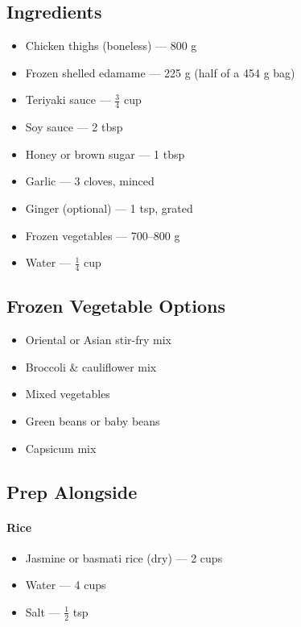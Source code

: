 \documentclass[11pt,a4paper]{article}
\begin{document}
\subsection*{Ingredients}
\begin{itemize}
    \item Chicken thighs (boneless) — 800 g
    \item Frozen shelled edamame — 225 g (half of a 454 g bag)
    \item Teriyaki sauce — $\tfrac{3}{4}$ cup
    \item Soy sauce — 2 tbsp
    \item Honey or brown sugar — 1 tbsp
    \item Garlic — 3 cloves, minced
    \item Ginger (optional) — 1 tsp, grated
    \item Frozen vegetables — 700--800 g
    \item Water — $\tfrac{1}{4}$ cup
\end{itemize}

\vspace{0.5em}

\subsection*{Frozen Vegetable Options}
\begin{itemize}
    \item Oriental or Asian stir-fry mix
    \item Broccoli \& cauliflower mix
    \item Mixed vegetables
    \item Green beans or baby beans
    \item Capsicum mix
\end{itemize}

\vspace{0.5em}

\subsection*{Prep Alongside}

\paragraph{Rice}
\begin{itemize}
    \item Jasmine or basmati rice (dry) — 2 cups
    \item Water — 4 cups
    \item Salt — $\tfrac{1}{2}$ tsp
\end{itemize}
\end{document}
